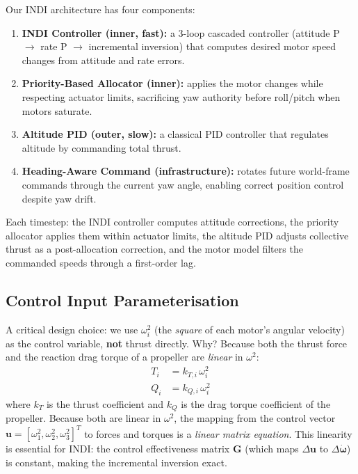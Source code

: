 \documentclass[12pt, a4paper]{article}
\newcommand{\bu}{\bm{u}}
\newcommand{\bomega}{\bm{\omega}}
\begin{document}
Our INDI architecture has four components:
\begin{enumerate}[label=\arabic*.]
    \item \textbf{INDI Controller (inner, fast):} a 3-loop cascaded controller (attitude P $\to$ rate P $\to$ incremental inversion) that computes desired motor speed changes from attitude and rate errors.
    \item \textbf{Priority-Based Allocator (inner):} applies the motor changes while respecting actuator limits, sacrificing yaw authority before roll/pitch when motors saturate.
    \item \textbf{Altitude PID (outer, slow):} a classical PID controller that regulates altitude by commanding total thrust.
    \item \textbf{Heading-Aware Command (infrastructure):} rotates future world-frame commands through the current yaw angle, enabling correct position control despite yaw drift.
\end{enumerate}
Each timestep: the INDI controller computes attitude corrections, the priority allocator applies them within actuator limits, the altitude PID adjusts collective thrust as a post-allocation correction, and the motor model filters the commanded speeds through a first-order lag.

\subsection{Control Input Parameterisation}

A critical design choice: we use $\omega_i^2$ (the \emph{square} of each motor's angular velocity) as the control variable, \textbf{not} thrust directly.  Why?  Because both the thrust force and the reaction drag torque of a propeller are \emph{linear} in $\omega^2$:
\begin{align}
    T_i &= k_{T,i} \, \omega_i^2  \label{eq:thrust} \\
    Q_i &= k_{Q,i} \, \omega_i^2  \label{eq:drag}
\end{align}
where $k_T$ is the thrust coefficient and $k_Q$ is the drag torque coefficient of the propeller.  Because both are linear in $\omega^2$, the mapping from the control vector $\bu = [\omega_1^2, \omega_2^2, \omega_3^2]^T$ to forces and torques is a \emph{linear matrix equation}.  This linearity is essential for INDI: the control effectiveness matrix $\bm{G}$ (which maps $\Delta\bu$ to $\Delta\dot{\bomega}$) is constant, making the incremental inversion exact.
\end{document}
